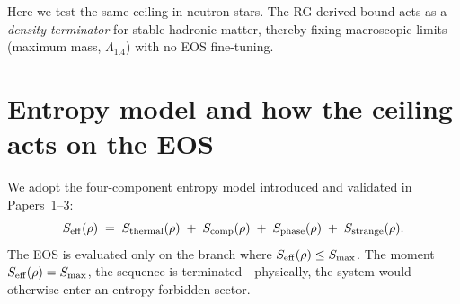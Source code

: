 \documentclass[11pt]{article}
\begin{document}
Here we test the same ceiling in neutron stars. The RG-derived bound acts as a \emph{density terminator} for stable hadronic matter, thereby fixing macroscopic limits (maximum mass, $\Lambda_{1.4}$) with no EOS fine-tuning.

\section{Entropy model and how the ceiling acts on the EOS}
\label{sec:entropy-model}
We adopt the four-component entropy model introduced and validated in Papers~1--3:
\begin{equation}
S_{\rm eff}(\rho) \;=\; S_{\rm thermal}(\rho)\;+\;S_{\rm comp}(\rho)\;+\;S_{\rm phase}(\rho)\;+\;S_{\rm strange}(\rho).
\end{equation}
The EOS is evaluated only on the branch where $S_{\rm eff}(\rho)\le S_{\max}$. The moment $S_{\rm eff}(\rho)=S_{\max}$, the sequence is terminated---physically, the system would otherwise enter an entropy-forbidden sector.
\end{document}

